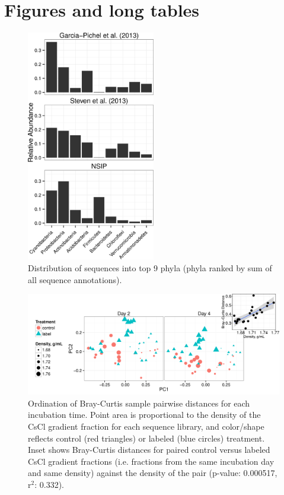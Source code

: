 \section{Figures and long tables}



\begin{figure}[h!]
  \centering
    \includegraphics[width=0.5\textwidth]{figures/study_phylum_dist/study_phylum_dist.png}
  \caption{Distribution of sequences into top 9 phyla (phyla ranked by sum of all sequence annotations).}
  \label{fig:study_phy_dist}
\end{figure}

\begin{figure}[h!]
  \centering
  \includegraphics[width=1.0\textwidth]{figures/ordination_all_day_facet/ordination_day_facet_w_inset.png}
  \caption{Ordination of Bray-Curtis sample pairwise distances for each incubation time. Point area is proportional to the density of the CsCl gradient fraction for each sequence library, and color/shape reflects control (red triangles) or labeled (blue circles) treatment. Inset shows Bray-Curtis distances for paired control versus labeled CsCl gradient fractions (i.e. fractions from the same incubation day and same density) against the density of the pair (p-value: 0.000517, r$^{2}$: 0.332).}
  \label{fig:ordination}
\end{figure}

